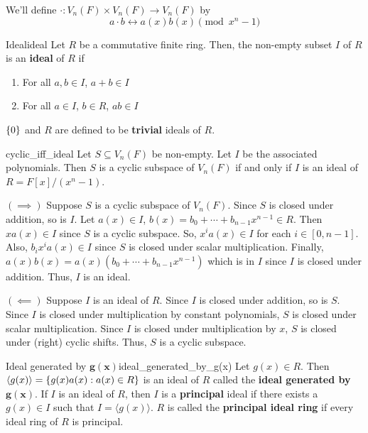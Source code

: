 We'll define $ \cdot : V_n(F)\times V_n(F)\to V_n(F) $
by
\[ a\cdot b \longleftrightarrow a(x)b(x)\pmod{x^n-1} \]

\begin{Definition}{Ideal}{ideal}
    Let $ R $ be a commutative finite ring. Then, the non-empty
    subset $ I $ of $ R $ is an \textbf{ideal} of $ R $ if
    \begin{enumerate}[label=(\arabic*)]
        \item For all $ a,b\in I $, $ a+b\in I $
        \item For all $ a\in I $, $ b\in R $, $ ab\in I $
    \end{enumerate}
    $ \{0\} $ and $ R $ are defined to be \textbf{trivial} ideals of $ R $.
\end{Definition}

\begin{Theorem}{}{cyclic_iff_ideal}
    Let $ S\subseteq V_n(F) $ be non-empty. Let $ I $ be the associated polynomials.
    Then $ S $ is a cyclic subspace of $ V_n(F) $ if and only if $ I $
    is an ideal of $ R=F[x]/(x^n-1) $.
\end{Theorem}

\begin{Proof}{}{}
    $ (\implies) $ Suppose $ S $ is a cyclic subspace of $ V_n(F) $.
    Since $ S $ is closed under addition, so is $ I $.
    Let $ a(x)\in I $, $ b(x)=b_0+\cdots+b_{n-1}x^{n-1}\in R $.
    Then $ xa(x)\in I $ since $ S $ is a cyclic subspace. So,
    $ x^i a(x)\in I $ for each $ i\in [0,n-1] $. Also,
    $ b_i x^i a(x)\in I $ since $ S $ is closed under scalar multiplication.
    Finally, $ a(x)b(x)=a(x)(b_0+\cdots+b_{n-1}x^{n-1}) $ which is in $ I $
    since $ I $ is closed under addition. Thus, $ I $ is an ideal.

    $ (\impliedby) $ Suppose $ I $ is an ideal of $ R $. Since $ I $
    is closed under addition, so is $ S $. Since $ I $ is closed
    under multiplication by constant polynomials, $ S $ is closed
    under scalar multiplication. Since $ I $ is closed under
    multiplication by $ x $, $ S $ is closed under (right) cyclic shifts.
    Thus, $ S $ is a cyclic subspace.
\end{Proof}

\begin{Definition}{Ideal generated by $\symbf{g(x)}$}{ideal_generated_by_g(x)}
    Let $ g(x)\in R $. Then $ \langle g(x) \rangle = \{g(x)a(x):a(x)\in R\} $
    is an ideal of $ R $ called the \textbf{ideal generated by $\symbf{g(x)}$}.
    If $ I $ is an ideal of $ R $, then $ I $ is a \textbf{principal}
    ideal if there exists a $ g(x)\in I $ such that $ I= \langle g(x) \rangle $.
    $ R $ is called the \textbf{principal ideal ring} if every ideal
    ring of $ R $ is principal.
\end{Definition}

